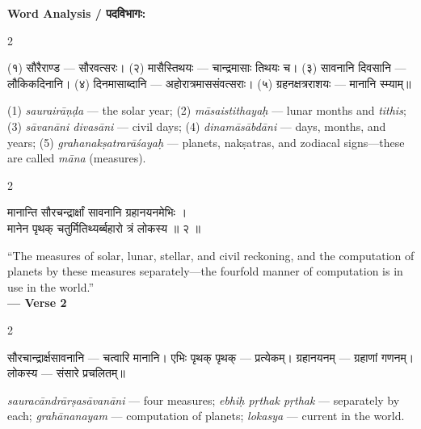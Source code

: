 \documentclass[11pt,a4paper]{article}
\newcommand{\dev}[1]{{\devanagarifont #1}}
\newenvironment{bilingualverse}{%
  \begin{paracol}{2}
  \fontsize{10.5}{13}\selectfont
}{%
  \end{paracol}
  \vspace{0.3cm}
}
\begin{document}
\textbf{Word Analysis / \dev{पदविभागः}:}

\begin{paracol}{2}
\begin{leftcolumn*}
\dev{(१) सौरैराण्ड} — सौरवत्सरः। \dev{(२) मासैस्तिथयः} — चान्द्रमासाः तिथयः च। \dev{(३) सावनानि दिवसानि} — लौकिकदिनानि। \dev{(४) दिनमासाब्दानि} — अहोरात्रमाससंवत्सराः। \dev{(५) ग्रहनक्षत्रराशयः} — मानानि स्म्याम्॥
\end{leftcolumn*}
\begin{rightcolumn}
(1) \textit{saurairāṇḍa} — the solar year; (2) \textit{māsaistithayaḥ} — lunar months and \textit{tithis}; (3) \textit{sāvanāni divasāni} — civil days; (4) \textit{dinamāsābdāni} — days, months, and years; (5) \textit{grahanakṣatrarāśayaḥ} — planets, nakṣatras, and zodiacal signs---these are called \textit{māna} (measures).
\end{rightcolumn}
\end{paracol}

\vspace{0.4cm}

\begin{bilingualverse}
\begin{leftcolumn*}
\dev{मानान्ति सौरचन्द्रार्क्षां सावनानि ग्रहानयनमेभिः ।}\\
\dev{मानेन पृथक् चतुर्मितिथ्यर्ब्बहारो त्रं लोकस्य ॥ २ ॥}
\end{leftcolumn*}
\begin{rightcolumn}
``The measures of solar, lunar, stellar, and civil reckoning, and the computation of planets by these measures separately---the fourfold manner of computation is in use in the world.''\\[0.3cm]
\hfill\textbf{— Verse 2}
\end{rightcolumn}
\end{bilingualverse}

\begin{paracol}{2}
\begin{leftcolumn*}
\dev{सौरचान्द्रार्क्षसावनानि} — चत्वारि मानानि। \dev{एभिः पृथक् पृथक्} — प्रत्येकम्। \dev{ग्रहानयनम्} — ग्रहाणां गणनम्। \dev{लोकस्य} — संसारे प्रचलितम्॥
\end{leftcolumn*}
\begin{rightcolumn}
\textit{sauracāndrārṣasāvanāni} — four measures; \textit{ebhiḥ pṛthak pṛthak} — separately by each; \textit{grahānanayam} — computation of planets; \textit{lokasya} — current in the world.
\end{rightcolumn}
\end{paracol}
\end{document}
